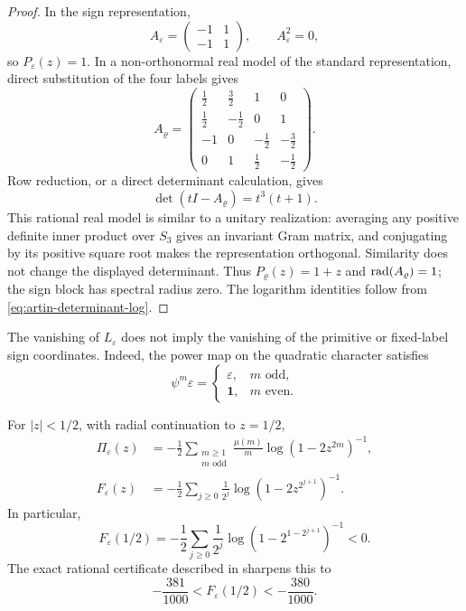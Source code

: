 \begin{proof}
In the sign representation,
\[
  A_\varepsilon=
  \begin{pmatrix}-1&1\\-1&1\end{pmatrix},
  \qquad A_\varepsilon^2=0,
  \]
so \(P_\varepsilon(z)=1\).  In a non-orthonormal real model of the standard
representation, direct substitution of the four labels gives
\[
  A_\varrho=
  \begin{pmatrix}
    \frac12&\frac32&1&0\\
    \frac12&-\frac12&0&1\\
    -1&0&-\frac12&-\frac32\\
    0&1&\frac12&-\frac12
  \end{pmatrix}.
\]
Row reduction, or a direct determinant calculation, gives
\[
  \det(tI-A_\varrho)=t^3(t+1).
  \]
This rational real model is similar to a unitary realization: averaging any
positive definite inner product over \(S_3\) gives an invariant Gram matrix,
and conjugating by its positive square root makes the representation
orthogonal.  Similarity does not change the displayed determinant.  Thus
\(P_\varrho(z)=1+z\) and \(\operatorname{rad}(A_\varrho)=1\); the sign block has
spectral radius zero.  The logarithm identities follow from
\eqref{eq:artin-determinant-log}.
\end{proof}

The vanishing of \(L_\varepsilon\) does not imply the vanishing of the
primitive or fixed-label sign coordinates.  Indeed, the power map on the
quadratic character satisfies
\[
  \psi^m\varepsilon=
  \begin{cases}
    \varepsilon,&m\text{ odd},\\
    \mathbf1,&m\text{ even}.
  \end{cases}
\]

\begin{lemma}\label{lem:s3-fixed-sign}
For \(|z|<1/2\), with radial continuation to \(z=1/2\),
\begin{align}
  \Pi_\varepsilon(z)
   &=-\frac12\sum_{\substack{m\geq1\\m\text{ odd}}}
       \frac{\mu(m)}m\log(1-2z^{2m})^{-1},
       \label{eq:s3-pi-sign}\\
  F_\varepsilon(z)
   &=-\frac12\sum_{j\geq0}\frac1{2^j}
       \log\!\left(1-2z^{2^{j+1}}\right)^{-1}.
       \label{eq:s3-f-sign}
\end{align}
In particular,
\begin{equation}\label{eq:s3-strict-negative}
  F_\varepsilon(1/2)
  =-\frac12\sum_{j\geq0}\frac1{2^j}
       \log\!\left(1-2^{1-2^{j+1}}\right)^{-1}<0.
\end{equation}
The exact rational certificate described in  sharpens
this to
\begin{equation}\label{eq:s3-rational-window}
  -\frac{381}{1000}<F_\varepsilon(1/2)<-\frac{380}{1000}.
\end{equation}
\end{lemma}

